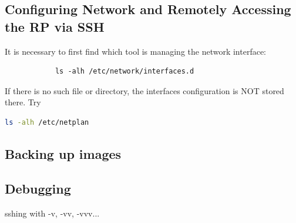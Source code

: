 \documentclass[a4paper, 10pt]{article}
\begin{document}
    


    \subsection{Configuring Network and Remotely Accessing the RP via SSH}
        It is necessary to first find which tool is managing the network interface:
        \begin{lstlisting}
            ls -alh /etc/network/interfaces.d
        \end{lstlisting}
        If there is no such file or directory, the interfaces configuration is NOT stored there. Try
        
        \begin{lstlisting}[language=bash]
            ls -alh /etc/netplan
        \end{lstlisting}

    \subsection{Backing up images}
    \subsection{Debugging}
    sshing with -v, -vv, -vvv...
    
\end{document}
